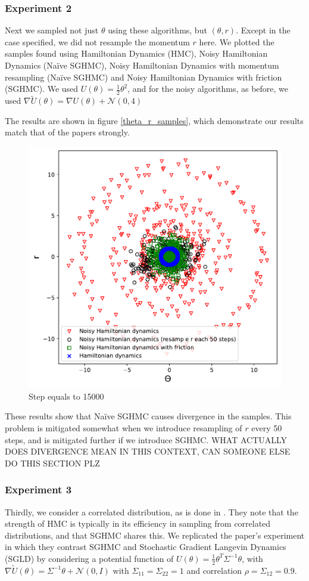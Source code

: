 \subsubsection*{Experiment 2}

Next we sampled not just $\theta$ using these algorithms, but $(\theta, r)$. Except in the case specified, we did not resample the momentum $r$ here. We plotted the samples found using Hamiltonian Dynamics (HMC), Noisy Hamiltonian Dynamics (Naïve SGHMC), Noisy Hamiltonian Dynamics with momentum resampling (Naïve SGHMC) and Noisy Hamiltonian Dynamics with friction (SGHMC). We used $U(\theta) = \frac{1}{2}\theta^2$, and for the noisy algorithms, as before, we used 
$\nabla \widetilde{U}(\theta) = \nabla U(\theta) + \mathcal{N}(0,4)$

The results are shown in figure \ref{theta_r_samples}, which demonstrate our results match that of the papers strongly. 

\begin{figure}[h!]
    \centering
    \includegraphics[width=0.6\linewidth]{parts/Images/fig2a.pdf}%
    \caption{Step equals to 15000}
     \label{fig:a}%
\end{figure}

These results show that Naïve SGHMC causes divergence in the samples. This problem is mitigated somewhat when we introduce resampling of $r$ every 50 steps, and is mitigated further if we introduce SGHMC. WHAT ACTUALLY DOES DIVERGENCE MEAN IN THIS CONTEXT, CAN SOMEONE ELSE DO THIS SECTION PLZ

\subsubsection*{Experiment 3}

Thirdly, we consider a correlated distribution, as is done in \cite{sghmc}. They note that the strength of HMC is typically in its efficiency in sampling from correlated distributions, and that SGHMC shares this. We replicated the paper's experiment in which they contrast SGHMC and Stochastic Gradient Langevin Dynamics (SGLD) by considering a potential function of $U(\theta)=\frac{1}{2}\theta^T\Sigma^{-1}\theta$, with
$\nabla \widetilde{U}(\theta) = \Sigma^{-1}\theta + \mathcal{N}(0,I)$ with $\Sigma_{11} = \Sigma_{22} = 1$ and correlation $\rho = \Sigma_{12} = 0.9$.  


